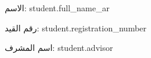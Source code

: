 \documentclass[fontsize=14,headinclude=true, headsepline=true,
footsepline=true]{scrartcl}
\begin{document}
\renewcommand*{\tableformat}{}
\renewcommand*{\captionformat}{}


{
}

الاسم: {{ student.full_name_ar }}

رقم القيد: {{ student.registration_number }}

اسم المشرف: {{ student.advisor }}
\end{document}
